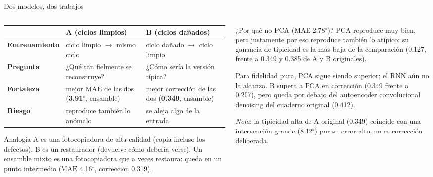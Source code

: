 \documentclass[aspectratio=169,10pt,t]{beamer}
\newcommand{\gr}{$^\circ$}
\newcommand{\mae}{\ensuremath{\mathrm{MAE}}}
\begin{document}
\begin{frame}{Dos modelos, dos trabajos}
\begin{columns}[T]
\begin{column}{0.58\textwidth}
\small
\begin{tabularx}{\textwidth}{@{}>{\bfseries}p{2.2cm}>{\raggedright\arraybackslash}X>{\raggedright\arraybackslash}X@{}}
\toprule
 & \textbf{A} (ciclos limpios) & \textbf{B} (ciclos dañados)\\
\midrule
Entrenamiento & ciclo limpio $\to$ mismo ciclo & ciclo dañado $\to$ ciclo limpio\\
Pregunta & ¿Qué tan fielmente se reconstruye? & ¿Cómo sería la versión típica?\\
Fortaleza & mejor \mae{} de las dos (\textbf{3.91\gr}, ensamble) & mejor corrección de las dos (\textbf{0.349}, ensamble)\\
Riesgo & reproduce también lo anómalo & se aleja algo de la entrada\\
\bottomrule
\end{tabularx}

\vspace{6pt}
\begin{block}{Analogía}
A es una fotocopiadora de alta calidad (copia incluso los defectos). B es un restaurador (devuelve cómo debería verse). Un ensamble mixto es una fotocopiadora que a veces restaura: queda en un punto intermedio (\mae{} 4.16\gr, corrección 0.319).
\end{block}
\end{column}
\begin{column}{0.4\textwidth}
\begin{alertblock}{¿Por qué no PCA (\mae{} 2.78\gr)?}\footnotesize
PCA reproduce muy bien, pero justamente por eso reproduce también lo atípico: su ganancia de tipicidad es la más baja de la comparación (0.127, frente a 0.349 y 0.385 de A y B originales).

\smallskip
Para fidelidad pura, PCA sigue siendo superior; el RNN aún no la alcanza. B supera a PCA en corrección (0.349 frente a 0.207), pero queda por debajo del autoencoder convolucional denoising del cuaderno original (0.412).\par\smallskip\textit{Nota}: la tipicidad alta de A original (0.349) coincide con una intervención grande (8.12\gr) por su error alto; no es corrección deliberada.
\end{alertblock}
\end{column}
\end{columns}
\end{frame}
\end{document}
